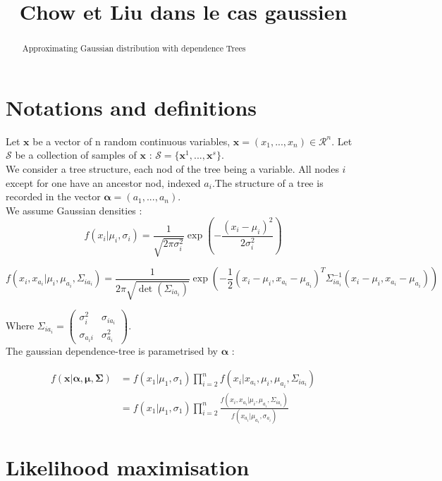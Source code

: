 \documentclass[a4paper,10pt]{article}
\title{Chow et Liu dans le cas gaussien}
\author{}
\begin{document}
\maketitle

\begin{abstract}
Approximating Gaussian distribution with dependence Trees
\end{abstract}

\section{Notations and definitions}
Let $\bm{x}$ be a vector of n random continuous variables, $\bm{x}=(x_1,...,x_n)\in \mathcal{R}^n$. Let
$\mathcal{S}$ be a collection of samples of $\bm{x}$ : $\mathcal{S}=\{\bm{x}^1,...,\bm{x}^s\}$.\\

We consider a tree structure, each nod of the tree being a variable. All nodes $i$ except for one have an ancestor nod,
 indexed $a_i$.The structure of a tree is recorded in the vector $\bm{\alpha}=(a_1,...,a_n)$.\\

We assume Gaussian densities : 
\[f(x_i |\mu_i,\sigma_i) = \frac{1}{\sqrt{2 \pi \sigma_i^2}}\exp\left(-\frac{(x_i-\mu_i)^2}{2\sigma_i^2} \right) \]


\[f(x_i,x_{a_i} |\mu_i,\mu_{a_i},\Sigma_{ia_i}) = \frac{1}{2 \pi\sqrt{ \det(\Sigma_{ia_i})}}\exp\left(-\frac{1}{2}(x_i-\mu_i,x_{a_i}-\mu_{a_i})^T \Sigma_{ia_i}^{-1}(x_i-\mu_i,x_{a_i}-\mu_{a_i}) \right) \]

Where $\Sigma_{ia_i} = \begin{pmatrix}
\sigma_i^2 & \sigma_{ia_i} \\
\sigma_{a_ii} & \sigma_{a_i}^2
\end{pmatrix}$.\\

The gaussian dependence-tree is parametrised by $\bm{\alpha}$ :



\begin{align*} 
f(\bm{x}|\bm{\alpha},\bm{\mu},\bm{\Sigma}) &= f(x_1|\mu_1, \sigma_1) \prod_{i=2}^{n} f(x_i|x_{a_i},\mu_i, \mu_{a_i},\Sigma_{ia_i})\\
 &= f(x_1|\mu_1, \sigma_1) \prod_{i=2}^{n} \frac{f(x_i,x_{a_i}|\mu_i, \mu_{a_i},\Sigma_{ia_i})}{f(x_{a_i}|\mu_{a_i},\sigma_{a_i})}
\end{align*}

\section{Likelihood maximisation}
\end{document}
